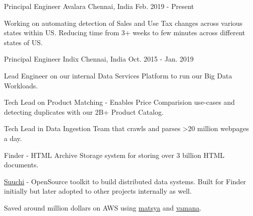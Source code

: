 

\begin{cventries}

  \cventry
    {Principal Engineer} %
    {Avalara} %
    {Chennai, India} %
    {Feb. 2019 - Present} %
    {
      \begin{cvitems} %
        \item {Working on automating detection of Sales and Use Tax changes across various states within US. Reducing time from 3+ weeks to few minutes across different states of US. }
      \end{cvitems}
    }

  \cventry
    {Principal Engineer} %
    {Indix} %
    {Chennai, India} %
    {Oct. 2015 - Jan. 2019} %
    {
      \begin{cvitems} %
        \item {Lead Engineer on our internal Data Services Platform to run our Big Data Workloads. }
        \item {Tech Lead on Product Matching - Enables Price Comparision use-cases and detecting duplicates with our 2B+ Product Catalog. }
        \item {Tech Lead in Data Ingestion Team that crawls and parses >20 million webpages a day. }
        \item {Finder - HTML Archive Storage system for storing over 3 billion HTML documents.}
        \item {\href{https://github.com/ashwanthkumar/suuchi}{Suuchi} - OpenSource toolkit to build distributed data systems. Built for Finder initially but later adopted to other projects internally as well. }
        \item {Saved around million dollars on AWS using \href{https://github.com/indix/matsya}{matsya} and \href{https://github.com/indix/vamana}{vamana}. }
      \end{cvitems}
    }


\end{cventries}
